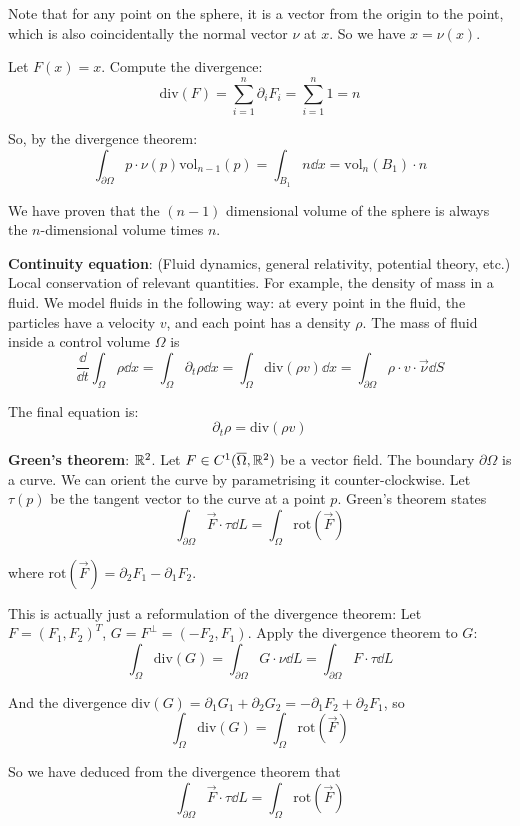\documentclass[12pt]{article}
\begin{document}
Note that for any point on the sphere, it is a vector from the origin to the point, which is also coincidentally the normal vector $\nu$ at $x$. So we have $x = \nu(x)$.

Let $F(x) = x$. Compute the divergence:
$$
    \mathrm{div}(F) = \sum_{i = 1}^{n} \partial_i F_i = \sum_{i = 1}^{n} 1 = n
$$

So, by the divergence theorem:
$$
    \int_{\partial \Omega} p \cdot \nu(p) \mathrm{vol}_{n-1}(p) = \int_{B_1} n \dd x = \mathrm{vol}_n(B_1) \cdot n
$$

We have proven that the $(n-1)$ dimensional volume of the sphere is always the $n$-dimensional volume times $n$.


\textbf{Continuity equation}: (Fluid dynamics, general relativity, potential theory, etc.) Local conservation of relevant quantities. For example, the density of mass in a fluid. We model fluids in the following way: at every point in the fluid, the particles have a velocity $v$, and each point has a density $\rho$. The mass of fluid inside a control volume $\Omega$ is
$$
    \frac{\dd}{\dd t} \int_{\Omega} \rho \dd x = \int_\Omega \partial_t \rho \dd x = \int_\Omega \mathrm{div}(\rho v) \dd x = \int_{\partial \Omega} \rho \cdot v \cdot \vec\nu \dd S
$$

The final equation is:
$$
    \partial_t \rho = \mathrm{div}(\rho v)
$$

\textbf{Green's theorem}: $\mathbb{R}^2$. Let $F \in C^1(\overline\Omega, \mathbb{R}^2)$ be a vector field. The boundary $\partial \Omega$ is a curve. We can orient the curve by parametrising it counter-clockwise. Let $\tau(p)$ be the tangent vector to the curve at a point $p$. Green's theorem states
$$
    \int_{\partial \Omega} \vec F \cdot \tau \dd L = \int_\Omega \mathrm{rot}(\vec{F})
$$

where $\mathrm{rot}(\vec{F}) = \partial_2 F_1 - \partial_1 F_2$.

This is actually just a reformulation of the divergence theorem: Let $F = (F_1,F_2)^T$, $G = F^\perp = (-F_2, F_1)$. Apply the divergence theorem to $G$:
$$
    \int_\Omega \mathrm{div}(G) = \int_{\partial \Omega} G \cdot \nu \dd L = \int_{\partial\Omega} F \cdot \tau \dd L
$$

And the divergence $\mathrm{div}(G) = \partial_1 G_1 + \partial_2 G_2 = -\partial_1 F_2 + \partial_2 F_1$, so
$$
    \int_\Omega \mathrm{div}(G) = \int_\Omega \mathrm{rot}(\vec{F})
$$

So we have deduced from the divergence theorem that
$$
    \int_{\partial \Omega} \vec F \cdot \tau \dd L = \int_\Omega \mathrm{rot}(\vec{F})
$$
\end{document}

